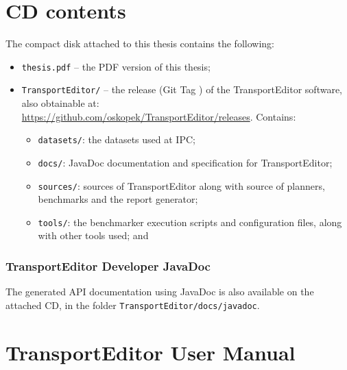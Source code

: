 

\section*{CD contents}\label{cd-contents}

The compact disk attached to this thesis contains the following:

\begin{itemize}
\item \verb+thesis.pdf+ -- the PDF version of this thesis;
\item \verb+TransportEditor/+ -- the \TEver{} release (Git Tag \TEtag{}) of the TransportEditor software, also obtainable at:\\
\url{https://github.com/oskopek/TransportEditor/releases}. Contains:
\begin{itemize}
\item \verb+datasets/+: the datasets used at IPC;
\item \verb+docs/+: JavaDoc documentation and specification for TransportEditor;
\item \verb+sources/+: sources of TransportEditor along with source of planners, benchmarks and the report generator;
\item \verb+tools/+: the benchmarker execution scripts and configuration files, along with other tools used; and
\end{itemize}
\end{itemize}

\subsubsection*{TransportEditor Developer JavaDoc}\label{transporteditor-developer-javadoc}

The generated API documentation using JavaDoc is also available on the attached CD, in the folder
\verb+TransportEditor/docs/javadoc+.

\newpage

\section*{TransportEditor User Manual}\label{transporteditor-user-manual}



